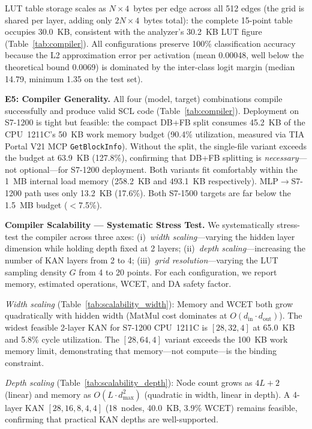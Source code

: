 \documentclass[journal,onecolumn]{IEEEtran}
\begin{document}
LUT table storage scales as $N \times 4$~bytes per edge across all 512 edges
(the grid is shared per layer, adding only $2N \times 4$~bytes total): the
complete 15-point table occupies 30.0~KB, consistent with the analyzer's
30.2~KB LUT figure (Table~\ref{tab:compiler}). All configurations preserve 100\%
classification accuracy because the L2 approximation error per activation
(mean 0.00048, well below the theoretical bound 0.0069) is dominated by the
inter-class logit margin (median 14.79, minimum 1.35 on the test set).

\noindent\textbf{E5: Compiler Generality.} All four (model, target) combinations
compile successfully and produce valid SCL code (Table~\ref{tab:compiler}).
Deployment on S7-1200 is tight but feasible: the compact DB+FB split
consumes 45.2~KB of the CPU~1211C's 50~KB work memory budget (90.4\%
utilization, measured via TIA Portal V21 MCP \texttt{GetBlockInfo}). Without
the split, the single-file variant exceeds the budget at 63.9~KB
(127.8\%), confirming that DB+FB splitting is \textit{necessary}---not
optional---for S7-1200 deployment. Both variants fit comfortably within the
1~MB internal load memory (258.2~KB and 493.1~KB respectively).
MLP$\to$S7-1200 path uses only 13.2~KB (17.6\%). Both S7-1500 targets are
far below the 1.5~MB budget ($<$7.5\%).

\vspace{4pt}
\noindent\textbf{Compiler Scalability --- Systematic Stress Test.}
We systematically stress-test the compiler across three axes:
(i)~\textit{width scaling}---varying the hidden layer dimension while holding
depth fixed at 2 layers; (ii)~\textit{depth scaling}---increasing the number
of KAN layers from 2 to 4; (iii)~\textit{grid resolution}---varying the
LUT sampling density $G$ from 4 to 20 points. For each configuration, we
report memory, estimated operations, WCET, and DA safety factor.

\textit{Width scaling} (Table~\ref{tab:scalability_width}): Memory and WCET
both grow quadratically with hidden width (MatMul cost dominates at
$O(d_{\text{in}}\cdot d_{\text{out}})$). The widest feasible 2-layer KAN
for S7-1200 CPU~1211C is $[28,32,4]$ at 65.0~KB and 5.8\% cycle utilization.
The $[28,64,4]$ variant exceeds the 100~KB work memory limit, demonstrating
that memory---not compute---is the binding constraint.

\textit{Depth scaling} (Table~\ref{tab:scalability_depth}): Node count grows
as $4L+2$ (linear) and memory as $O(L\cdot d_{\max}^2)$ (quadratic in
width, linear in depth). A 4-layer KAN $[28,16,8,4,4]$ (18~nodes, 40.0~KB,
3.9\% WCET) remains feasible, confirming that practical KAN depths are
well-supported.
\end{document}
